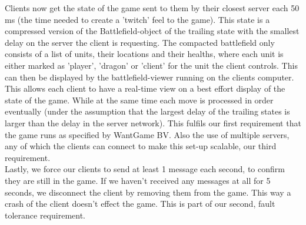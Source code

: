 Clients now get the state of the game sent to them by their closest server each 50 ms (the time needed to create a 'twitch' feel to the game). This state is a compressed version of the Battlefield-object of the trailing state with the smallest delay on the server the client is requesting. The compacted battlefield only consists of a list of units, their locations and their healths, where each unit is either marked as 'player', 'dragon' or 'client' for the unit the client controls. This can then be displayed by the battlefield-viewer running on the clients computer.\\
This allows each client to have a real-time view on a best effort display of the state of the game. While at the same time each move is processed in order eventually (under the assumption that the largest delay of the trailing states is larger than the delay in the server network). This fulfils our first requirement that the game runs as specified by WantGame BV. Also the use of multiple servers, any of which the clients can connect to make this set-up scalable, our third requirement.\\
Lastly, we force our clients to send at least 1 message each second, to confirm they are still in the game. If we haven't received any messages at all for 5 seconds, we disconnect the client by removing them from the game. This way a crash of the client doesn't effect the game. This is part of our second, fault tolerance requirement.\\
